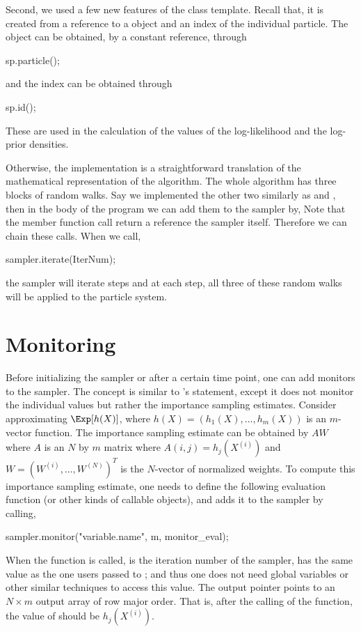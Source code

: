 Second, we used a few new features of the  class template. Recall that, it is created from a reference to a  object and an index of the individual particle. The  object can be obtained, by a constant reference, through
\begin{cppcode}
sp.particle();
\end{cppcode}
and the index can be obtained through
\begin{cppcode}
sp.id();
\end{cppcode}
These are used in the calculation of the values of the log-likelihood and the log-prior densities.

Otherwise, the implementation is a straightforward translation of the mathematical representation of the algorithm. The whole algorithm has three blocks of random walks. Say we implemented the other two similarly as  and , then in the body of the program we can add them to the sampler by,
Note that the  member function call return a reference the sampler itself. Therefore we can chain these calls. When we call,
\begin{cppcode}
sampler.iterate(IterNum);
\end{cppcode}
the sampler will iterate  steps and at each step, all three of these random walks will be applied to the particle system.

\section{Monitoring}
\label{sec:Monitoring}

Before initializing the sampler or after a certain time point, one can add monitors to the sampler. The concept is similar to \bugs's  statement, except it does not monitor the individual values but rather the importance sampling estimates. Consider approximating $\Exp[h(X)]$, where $h(X) = (h_1(X),\dots,h_m(X))$ is an $m$-vector function. The importance sampling estimate can be obtained by $AW$ where $A$ is an $N$ by $m$ matrix where $A(i,j) = h_j(X^{(i)})$ and $W = (W^{(i)},\dots,W^{(N)})^T$ is the $N$-vector of normalized weights. To compute this importance sampling estimate, one needs to define the following evaluation function (or other kinds of callable objects),
and adds it to the sampler by calling,
\begin{cppcode}
sampler.monitor("variable.name", m, monitor_eval);
\end{cppcode}
When the function  is called,  is the iteration number of the sampler,  has the same value as the one users passed to ; and thus one does not need global variables or other similar techniques to access this value. The output pointer  points to an $N \times m$ output array of row major order. That is, after the calling of the function, the value of  should be $h_j(X^{(i)})$.


